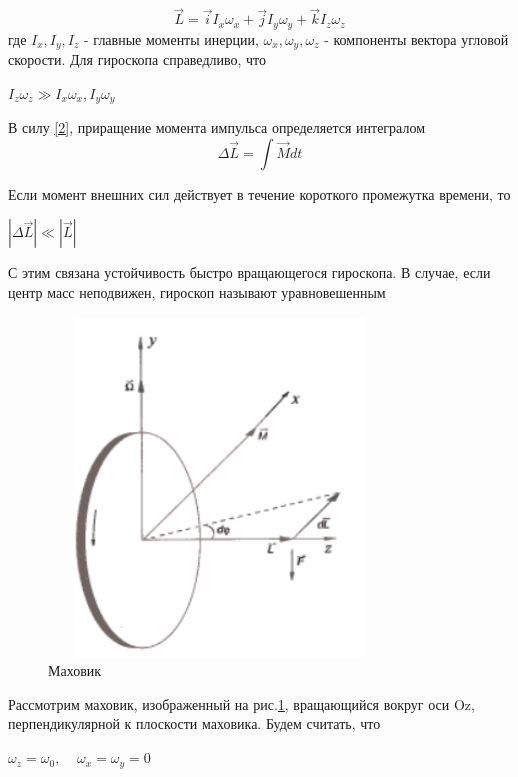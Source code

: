 \documentclass[12pt,a4paper]{article}
\begin{document}
\begin{equation}
\vec{L}=\vec{i}I_{x}\omega_{x}+\vec{j}I_{y}\omega_{y}+\vec{k}I_{z}\omega_{z} \label{3}
\end{equation}
где $I_{x}, I_{y}, I_{z}$ - главные моменты инерции, $\omega_{x}, \omega_{y}, \omega_{z}$ - компоненты вектора угловой скорости. Для гироскопа справедливо, что 
\begin{center}
$I_{z}\omega_{z} \gg I_{x}\omega_{x}, I_{y}\omega_{y}$ 
\end{center}
\par В силу \ref{2}, приращение момента импульса определяется интегралом
\begin{equation}
\Delta\vec{L}=\int \vec{M}dt \label{4}
\end{equation}
\par Если момент внешних сил действует в течение короткого промежутка времени, то
\begin{center}
$|\Delta\vec{L}| \ll |\vec{L}|$
\end{center}
С этим связана устойчивость быстро вращающегося гироскопа. В случае, если центр масс неподвижен, гироскоп называют уравновешенным 
\begin{figure}[H]
\centering
\includegraphics[width=9cm, height=9cm]{1.2.5_1}
\caption{Маховик}
\label{рис.1}
\end{figure}
\begin{par}
Рассмотрим маховик, изображенный на рис.\ref{рис.1}, вращающийся вокруг оси Oz, перпендикулярной к плоскости маховика. Будем считать, что 
\end{par}
\begin{center}
$\omega_{z}=\omega_{0}, \;\;\;\; \omega_{x}=\omega_{y}=0 $
\end{center}
\end{document}

